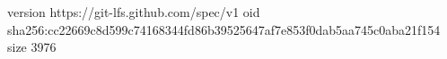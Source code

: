 version https://git-lfs.github.com/spec/v1
oid sha256:cc22669c8d599c74168344fd86b39525647af7e853f0dab5aa745c0aba21f154
size 3976
